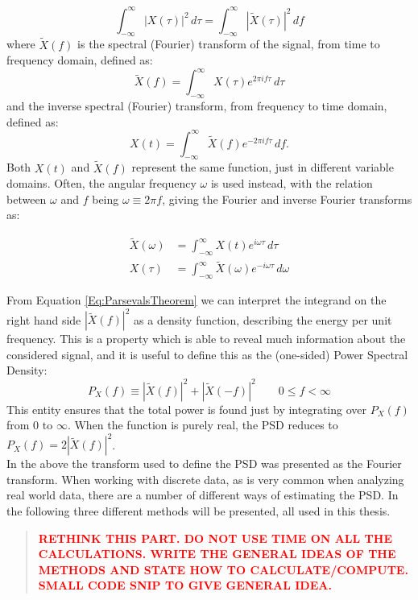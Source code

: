 \documentclass[../../CompleteThesis/Complete_1stDraft]{subfiles}
\begin{document}
\begin{equation}
	\int_{-\infty}^{\infty} |X(\tau)|^2 \, d\tau = \int_{-\infty}^{\infty} |\tilde{X}(\tau)|^2\, df
	\label{Eq:ParsevalsTheorem}
\end{equation}
where $\tilde{X}(f)$ is the spectral (Fourier) transform of the signal, from time to frequency domain, defined as:
\begin{equation}
	\tilde{X}(f) = \int_{-\infty}^{\infty} X(\tau) e^{2\pi i f \tau} \, d\tau
	\label{Eq:FourierTransform}
\end{equation}
and the inverse spectral (Fourier) transform, from frequency to time domain, defined as:
\begin{equation}
	X(t) = \int_{-\infty}^{\infty} \tilde{X}(f) e^{-2\pi i f \tau}\, df.
	\label{Eq:InverseFourierTransform}
\end{equation}
Both $X(t)$ and $\tilde{X}(f)$ represent the same function, just in different variable domains. Often, the angular frequency $\omega$ is used instead, with the relation between $\omega$ and $f$ being $\omega \equiv 2\pi f $, giving the Fourier and inverse Fourier transforms as:

\begin{equation}
	\begin{aligned}
		\tilde{X}(\omega) &= \int_{-\infty}^{\infty} X(t) e^{i\omega\tau}\, d\tau \\
		X(\tau) &= \int_{-\infty}^{\infty} \tilde{X}(\omega) e^{-i\omega\tau}\, d\omega
		\label{Eq:FourierTransformAngular}
	\end{aligned} 
\end{equation}

From Equation \ref{Eq:ParsevalsTheorem} we can interpret the integrand on the right hand side $|\tilde{X}(f)|^2$ as a density function, describing the energy per unit frequency. This is a property which is able to reveal much information about the considered signal, and it is useful to define this as the (one-sided) Power Spectral Density: 
\begin{equation}
	P_X(f) \equiv |\tilde{X}(f)|^2 + |\tilde{X}(-f)|^2 \qquad 0 \leq f < \infty
\end{equation}
This entity ensures that the total power is found just by integrating over $P_X(f)$ from 0 to $\infty$. When the function is purely real, the PSD reduces to $P_X(f) = 2|\tilde{X}(f)|^2$.\\
In the above the transform used to define the PSD was presented as the Fourier transform. When working with discrete data, as is very common when analyzing real world data, there are a number of different ways of estimating the PSD. In the following three different methods will be presented, all used in this thesis.
\newline
{}
\begin{quote}
	\textcolor{red}{\textbf{RETHINK THIS PART. DO NOT USE TIME ON ALL THE CALCULATIONS. WRITE THE GENERAL IDEAS OF THE METHODS AND STATE HOW TO CALCULATE/COMPUTE. SMALL CODE SNIP TO GIVE GENERAL IDEA.}}
\end{quote}
\end{document}
